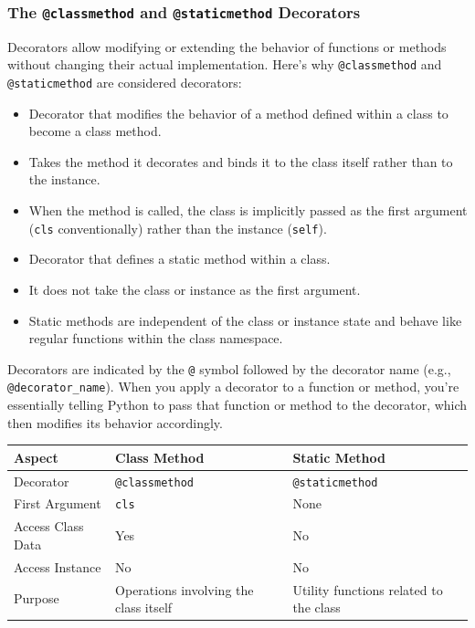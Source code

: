 \newpage
\subsubsection{The \texttt{@classmethod} and \texttt{@staticmethod} Decorators}

Decorators allow modifying or extending the behavior of functions or methods without changing their actual implementation. Here's why \texttt{@classmethod} and \texttt{@staticmethod} are considered decorators:

\begin{itemize}
    \item Decorator that modifies the behavior of a method defined within a class to become a class method.
    \item Takes the method it decorates and binds it to the class itself rather than to the instance.
    \item When the method is called, the class is implicitly passed as the first argument (\texttt{cls} conventionally) rather than the instance (\texttt{self}).
\end{itemize}

\begin{itemize}
    \item Decorator that defines a static method within a class.
    \item It does not take the class or instance as the first argument.
    \item Static methods are independent of the class or instance state and behave like regular functions within the class namespace.
\end{itemize}

Decorators are indicated by the \texttt{@} symbol followed by the decorator name (e.g., \texttt{@decorator\_name}). When you apply a decorator to a function or method, you're essentially telling Python to pass that function or method to the decorator, which then modifies its behavior accordingly.

\begin{table}[htbp]
    \centering
    \begin{tabular}{@{}lll@{}}
    \toprule
    \textbf{Aspect}     & \textbf{Class Method}             & \textbf{Static Method}              \\ \midrule
    Decorator           & \texttt{@classmethod}             & \texttt{@staticmethod}             \\
    First Argument      & \texttt{cls}                       & None                                \\
    Access Class Data   & Yes                                & No                                  \\
    Access Instance     & No                                & No                                  \\
    Purpose             & Operations involving the class itself  & Utility functions related to the class \\
    \bottomrule
    \end{tabular}
\end{table}

